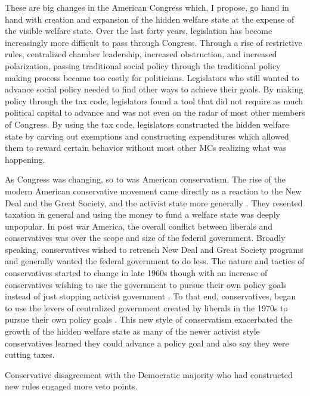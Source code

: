 \documentclass[12pt]{article}
\begin{document}
These are big changes in the American Congress which, I propose, go hand in hand with creation and expansion of the hidden welfare state at the expense of the visible welfare state. Over the last forty years, legislation has become increasingly more difficult to pass through Congress. Through a rise of restrictive rules, centralized chamber leadership, increased obstruction, and increased polarization, passing traditional social policy through the traditional policy making process became too costly for politicians. Legislators who still wanted to advance social policy needed to find other ways to achieve their goals. By making policy through the tax code, legislators found a tool that did not require as much political capital to advance and was not even on the radar of most other members of Congress. By using the tax code, legislators constructed the hidden welfare state by carving out exemptions and constructing expenditures which allowed them to reward certain behavior without most other MCs realizing what was happening. 

As Congress was changing, so to was American conservatism. The rise of the modern American conservative movement came directly as a reaction to the New Deal and the Great Society, and the activist state more generally \citep{critchlow2007, zelizer2010}. They resented taxation in general and using the money to fund a welfare state was deeply unpopular. In post war America, the overall conflict between liberals and conservatives was over the scope and size of the federal government. Broadly speaking, conservatives wished to retrench New Deal and Great Society programs and generally wanted the federal government to do less. The nature and tactics of conservatives started to change in late 1960s though with an increase of conservatives wishing to use the government to pursue their own policy goals instead of just stopping activist government \citep{teles2007, skocpol2007}. To that end, conservatives, began to use the levers of centralized government created by liberals in the 1970s to pursue their own policy goals \citep{hacker2004}. This new style of conservatism exacerbated the growth of the hidden welfare state as many of the newer activist style conservatives learned they could advance a policy goal and also say they were cutting taxes.

Conservative disagreement with the Democratic majority who had constructed new rules engaged more veto points. \citep{schickler2001}
\end{document}
